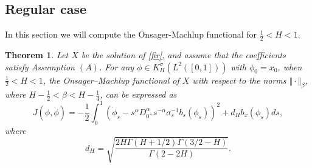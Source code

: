 \documentclass[preprint,12pt]{elsarticle}
\newtheorem{theorem}{Theorem}[section]
\theoremstyle{definition}  %
\theoremstyle{plain}  %
\begin{document}
\subsection{Regular case }
In this section we will compute the Onsager-Machlup functional for $ \frac{1}{2}<H<1.$
\begin{theorem} \label{result2}  Let $X$ be the solution of \eqref{fir}, and assume that the coefficients satisfy Assumption \((A)\).
For any $\phi \in K_H^\sigma(L^2([0,1]))$ with $\phi_0 = x_0$, when $ \tfrac{1}{2} < H < 1$, 
the Onsager--Machlup functional of $X$ with respect to the norms 
$\Vert \cdot \Vert_\beta$, where $H-\tfrac{1}{2}<\beta<H-\tfrac{1}{4}$, 
 can be expressed as 
	\begin{equation*}
	J(\phi,\dot{\phi})=-\frac{1}{2} \int_0^1 \left(\dot{\phi}_s-s^{\alpha}D_{0^+}^\alpha s^{-\alpha}  \sigma_s^{-1} b_s\left(\phi_s\right)\right)^2+d_H b_x(\phi_s)ds,
\end{equation*}
where
\begin{equation*}
    d_H= \sqrt{\frac{2H\Gamma(H+1/2)\Gamma(3/2-H)}{\Gamma(2-2H)}}.
\end{equation*}
\end{theorem}
\end{document}
